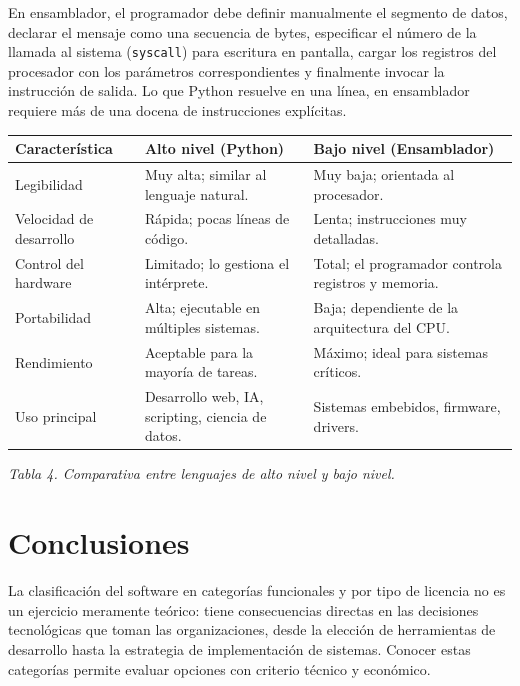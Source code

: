 \documentclass[12pt,a4paper]{article}
\begin{document}
	\doublespacing
	
	En ensamblador, el programador debe definir manualmente el segmento de datos, declarar el mensaje como una secuencia de bytes, especificar el número de la llamada al sistema (\texttt{syscall}) para escritura en pantalla, cargar los registros del procesador con los parámetros correspondientes y finalmente invocar la instrucción de salida. Lo que Python resuelve en una línea, en ensamblador requiere más de una docena de instrucciones explícitas.
	
	\begin{center}
		\singlespacing
		\begin{tabular}{|p{4cm}|p{4.5cm}|p{4.5cm}|}
			\hline
			\textbf{Característica} & \textbf{Alto nivel (Python)} & \textbf{Bajo nivel (Ensamblador)} \\ \hline
			Legibilidad & Muy alta; similar al lenguaje natural. & Muy baja; orientada al procesador. \\ \hline
			Velocidad de desarrollo & Rápida; pocas líneas de código. & Lenta; instrucciones muy detalladas. \\ \hline
			Control del hardware & Limitado; lo gestiona el intérprete. & Total; el programador controla registros y memoria. \\ \hline
			Portabilidad & Alta; ejecutable en múltiples sistemas. & Baja; dependiente de la arquitectura del CPU. \\ \hline
			Rendimiento & Aceptable para la mayoría de tareas. & Máximo; ideal para sistemas críticos. \\ \hline
			Uso principal & Desarrollo web, IA, scripting, ciencia de datos. & Sistemas embebidos, firmware, drivers. \\ \hline
		\end{tabular}
		
		\vspace{0.3cm}
		\textit{Tabla 4. Comparativa entre lenguajes de alto nivel y bajo nivel.}
	\end{center}
	
	\doublespacing
	
	\section{Conclusiones}
	
	La clasificación del software en categorías funcionales y por tipo de licencia no es un ejercicio meramente teórico: tiene consecuencias directas en las decisiones tecnológicas que toman las organizaciones, desde la elección de herramientas de desarrollo hasta la estrategia de implementación de sistemas. Conocer estas categorías permite evaluar opciones con criterio técnico y económico.
	
\end{document}
